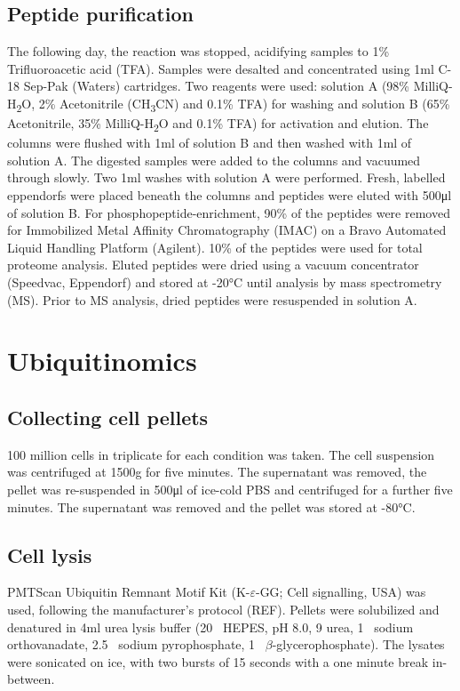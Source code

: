 \subsection{Peptide purification}
The following day, the reaction was stopped, acidifying samples to 1\% Trifluoroacetic acid (TFA).
Samples were desalted and concentrated using 1ml C-18 Sep-Pak (Waters) cartridges.
Two reagents were used: solution A (98\% MilliQ-H\textsubscript{2}O, 2\% Acetonitrile (CH\textsubscript{3}CN) and 0.1\% TFA) for washing and solution B (65\% Acetonitrile, 35\% MilliQ-H\textsubscript{2}O and 0.1\% TFA) for activation and elution.
The columns were flushed with 1ml of solution B and then washed with 1\si{\ml} of solution A.
The digested samples were added to the columns and vacuumed through slowly.
Two 1\si{\ml} washes with solution A were performed.
Fresh, labelled eppendorfs were placed beneath the columns and peptides were eluted with 500\si{\ul} of solution B.
For phosphopeptide-enrichment, 90\% of the peptides were removed for Immobilized Metal Affinity Chromatography (IMAC) on a Bravo Automated Liquid Handling Platform (Agilent).
10\% of the peptides were used for total proteome analysis.
Eluted peptides were dried using a vacuum concentrator (Speedvac, Eppendorf) and stored at -20\si{\degreeCelsius} until analysis by mass spectrometry (MS).
Prior to MS analysis, dried peptides were resuspended in solution A.


\section{Ubiquitinomics}
%
\subsection{Collecting cell pellets}
100 million cells in triplicate for each condition was taken.
The cell suspension was centrifuged at 1500g for five minutes.
The supernatant was removed, the pellet was re-suspended in 500\si{\ul} of ice-cold PBS and centrifuged for a further five minutes.
The supernatant was removed and the pellet was stored at -80\si{\degreeCelsius}.

\subsection{Cell lysis}
PMTScan Ubiquitin Remnant Motif Kit (K-$\varepsilon$-GG; Cell signalling, USA) was used, following the manufacturer's protocol (REF).
Pellets were solubilized and denatured in 4\si{\ml} urea lysis buffer (20\si{\milli\Molar} HEPES, pH 8.0, 9\si{\Molar} urea, 1\si{\milli\Molar} sodium orthovanadate, 2.5\si{\milli\Molar} sodium pyrophosphate, 1\si{\milli\Molar} $\beta$-glycerophosphate).
The lysates were sonicated on ice, with two bursts of 15 seconds with a one minute break in-between.

